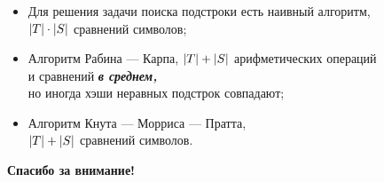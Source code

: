 \documentclass[11pt,aspectratio=169,svgnames]{beamer}
\DeclarePairedDelimiter{\len}{|}{|}
\begin{document}
\begin{frame} \frametitle{\vspace*{-2.4cm}}
\begin{itemize}
	\item Для решения задачи поиска подстроки есть наивный алгоритм,\\
	 \(\len*{T} \cdot \len*{S}\) сравнений символов; \medskip
	\item Алгоритм Рабина — Карпа, \(\len*{T} + \len*{S}\) арифметических операций\\
	 и сравнений {\itshape\bfseries в среднем,}\\
	 но иногда хэши неравных подстрок совпадают; \medskip
	\item Алгоритм Кнута — Морриса — Пратта,\\
	 \(\len*{T} + \len*{S}\) сравнений символов.
\end{itemize} \bigskip

\begin{center}
	\Large\bf Спасибо за внимание!
\end{center}
\end{frame}
\end{document}
